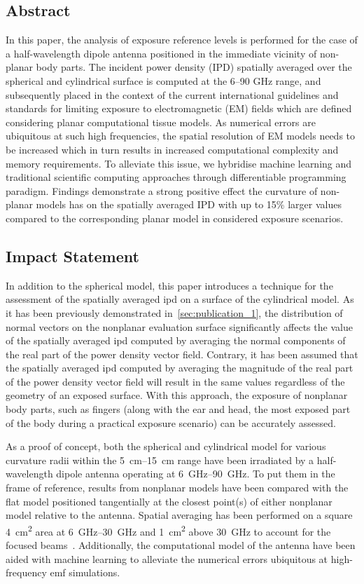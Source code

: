 \subsection{Abstract}
In this paper, the analysis of exposure reference levels is performed for the case of a half-wavelength dipole antenna positioned in the immediate vicinity of non-planar body parts.
The incident power density (IPD) spatially averaged over the spherical and cylindrical surface is computed at the 6–90 GHz range, and subsequently placed in the context of the current international guidelines and standards for limiting exposure to electromagnetic (EM) ﬁelds which are deﬁned considering planar computational tissue models.
As numerical errors are ubiquitous at such high frequencies, the spatial resolution of EM models needs to be increased which in turn results in increased computational complexity and memory requirements.
To alleviate this issue, we hybridise machine learning and traditional scientiﬁc computing approaches through differentiable programming paradigm.
Findings demonstrate a strong positive effect the curvature of non-planar models has on the spatially averaged IPD with up to 15\% larger values compared to the corresponding planar model in considered exposure scenarios.

\subsection{Impact Statement}
In addition to the spherical model, this paper introduces a technique for the assessment of the spatially averaged \gls{ipd} on a surface of the cylindrical model.
As it has been previously demonstrated in~\cref{sec:publication_1}, the distribution of normal vectors on the nonplanar evaluation surface significantly affects the value of the spatially averaged \gls{ipd} computed by averaging the normal components of the real part of the power density vector field.
Contrary, it has been assumed that the spatially averaged \gls{ipd} computed by averaging the magnitude of the real part of the power density vector field will result in the same values regardless of the geometry of an exposed surface.
With this approach, the exposure of nonplanar body parts, such as fingers (along with the ear and head, the most exposed part of the body during a practical exposure scenario) can be accurately assessed.

As a proof of concept, both the spherical and cylindrical model for various curvature radii within the \SIrange{5}{15}{\cm} range have been irradiated by a half-wavelength dipole antenna operating at \SIrange{6}{90}{\GHz}.
To put them in the frame of reference, results from nonplanar models have been compared with the flat model positioned tangentially at the closest point(s) of either nonplanar model relative to the antenna.
Spatial averaging has been performed on a square \SI{4}{\cm\squared} area at \SIrange{6}{30}{\GHz} and \SI{1}{\cm\squared} above \SI{30}{\GHz} to account for the focused beams~\cite{Hashimoto2017averaging,Foster2016Thermal}.
Additionally, the computational model of the antenna have been aided with machine learning to alleviate the numerical errors ubiquitous at high-frequency \gls{emf} simulations.

